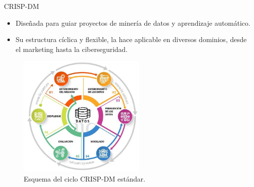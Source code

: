 \begin{frame}{CRISP-DM}
\begin{itemize}
	\item Diseñada para guiar proyectos de minería de datos y aprendizaje automático.
	\item Su estructura cíclica y flexible, la hace aplicable en diversos dominios, desde el marketing hasta la ciberseguridad.
\end{itemize}
	
    \begin{figure}[H]
    \centering
    \includegraphics[width=0.55\textwidth]{../Memoria/img/metodologia/crispdm.jpeg}
    \caption{Esquema del ciclo CRISP-DM estándar.}
    \label{fig:CRISP-DM}
\end{figure}
    
\end{frame}


